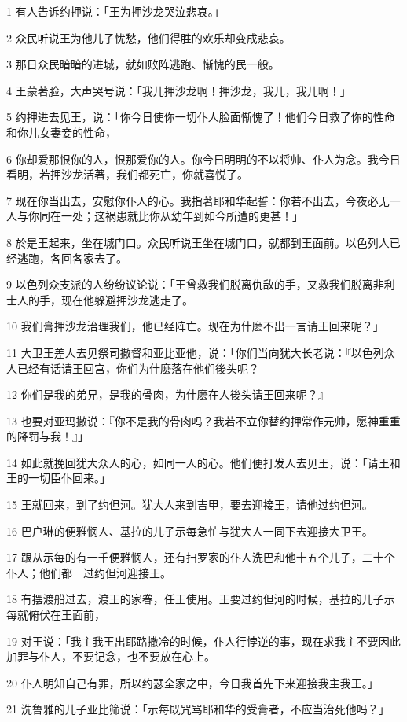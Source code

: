 \par 1 有人告诉约押说：「王为押沙龙哭泣悲哀。」
\par 2 众民听说王为他儿子忧愁，他们得胜的欢乐却变成悲哀。
\par 3 那日众民暗暗的进城，就如败阵逃跑、惭愧的民一般。
\par 4 王蒙著脸，大声哭号说：「我儿押沙龙啊！押沙龙，我儿，我儿啊！」
\par 5 约押进去见王，说：「你今日使你一切仆人脸面惭愧了！他们今日救了你的性命和你儿女妻妾的性命，
\par 6 你却爱那恨你的人，恨那爱你的人。你今日明明的不以将帅、仆人为念。我今日看明，若押沙龙活著，我们都死亡，你就喜悦了。
\par 7 现在你当出去，安慰你仆人的心。我指著耶和华起誓：你若不出去，今夜必无一人与你同在一处；这祸患就比你从幼年到如今所遭的更甚！」
\par 8 於是王起来，坐在城门口。众民听说王坐在城门口，就都到王面前。以色列人已经逃跑，各回各家去了。
\par 9 以色列众支派的人纷纷议论说：「王曾救我们脱离仇敌的手，又救我们脱离非利士人的手，现在他躲避押沙龙逃走了。
\par 10 我们膏押沙龙治理我们，他已经阵亡。现在为什麽不出一言请王回来呢？」
\par 11 大卫王差人去见祭司撒督和亚比亚他，说：「你们当向犹大长老说：『以色列众人已经有话请王回宫，你们为什麽落在他们後头呢？
\par 12 你们是我的弟兄，是我的骨肉，为什麽在人後头请王回来呢？』
\par 13 也要对亚玛撒说：『你不是我的骨肉吗？我若不立你替约押常作元帅，愿神重重的降罚与我！』」
\par 14 如此就挽回犹大众人的心，如同一人的心。他们便打发人去见王，说：「请王和王的一切臣仆回来。」
\par 15 王就回来，到了约但河。犹大人来到吉甲，要去迎接王，请他过约但河。
\par 16 巴户琳的便雅悯人、基拉的儿子示每急忙与犹大人一同下去迎接大卫王。
\par 17 跟从示每的有一千便雅悯人，还有扫罗家的仆人洗巴和他十五个儿子，二十个仆人；他们都　过约但河迎接王。
\par 18 有摆渡船过去，渡王的家眷，任王使用。王要过约但河的时候，基拉的儿子示每就俯伏在王面前，
\par 19 对王说：「我主我王出耶路撒冷的时候，仆人行悖逆的事，现在求我主不要因此加罪与仆人，不要记念，也不要放在心上。
\par 20 仆人明知自己有罪，所以约瑟全家之中，今日我首先下来迎接我主我王。」
\par 21 洗鲁雅的儿子亚比筛说：「示每既咒骂耶和华的受膏者，不应当治死他吗？」

